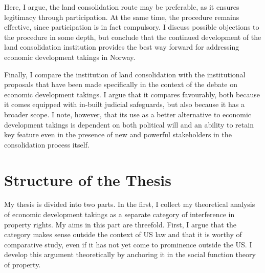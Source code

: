 Here, I argue, the land consolidation route may be preferable, as it ensures legitimacy through participation. At the same time, the procedure remains effective, since participation is in fact compulsory. I discuss possible objections to the procedure in some depth, but conclude that the continued development of the land consolidation institution provides the best way forward for addressing economic development takings in Norway.

Finally, I compare the institution of land consolidation with the institutional proposals that have been made specifically in the context of the debate on economic development takings. I argue that it compares favourably, both because it comes equipped with in-built judicial safeguards, but also because it has a broader scope. I note, however, that its use as a better alternative to economic development takings is dependent on both political will and an ability to retain key feature even in the presence of new and powerful stakeholders in the consolidation process itself.


\section{Structure of the Thesis}

My thesis is divided into two parts. In the first, I collect my theoretical analysis of economic development takings as a separate category of interference in property rights. My aims in this part are threefold. First, I argue that the category makes sense outside the context of US law and that it is worthy of comparative study, even if it has not yet come to prominence outside the US. I develop this argument theoretically by anchoring it in the social function theory of property. 


